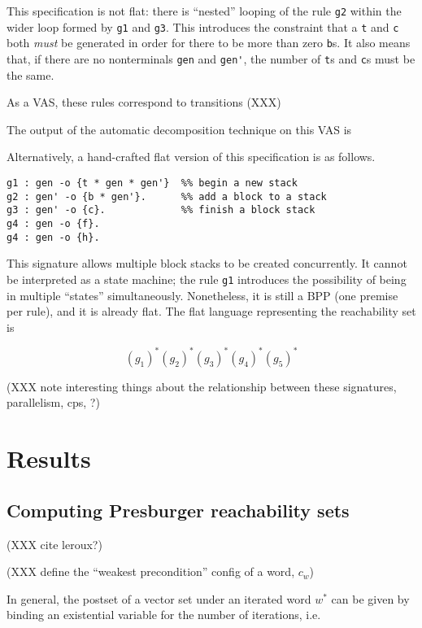 \documentclass[fullpage, 11pt]{article}
\begin{document}
This specification is not flat: there is ``nested'' looping of the rule
\verb|g2| within the wider loop formed by \verb|g1| and \verb|g3|. This
introduces the constraint that a \verb|t| and \verb|c| both {\em must} be
generated in order for there to be more than zero \verb|b|s. It also means
that, if there are no nonterminals \verb|gen| and \verb|gen'|, the number
of \verb|t|s and \verb|c|s must be the same.

As a VAS, these rules correspond to transitions (XXX)

The output of the automatic decomposition technique on this VAS is

Alternatively, a hand-crafted flat version of this specification is as
follows.

\begin{verbatim}
g1 : gen -o {t * gen * gen'}  %% begin a new stack
g2 : gen' -o {b * gen'}.      %% add a block to a stack
g3 : gen' -o {c}.             %% finish a block stack
g4 : gen -o {f}.        
g4 : gen -o {h}.       
\end{verbatim}

This signature allows multiple block stacks to be created concurrently. It
cannot be interpreted as a state machine; the rule \verb|g1| introduces the
possibility of being in multiple ``states'' simultaneously. Nonetheless, it
is still a BPP (one premise per rule), and it is already flat. The flat
language representing the reachability set is

\[
(g_1)^*(g_2)^*(g_3)^*(g_4)^*(g_5)^*
\]

(XXX note interesting things about the relationship between these
 signatures, parallelism, cps, ?)

\section{Results}

\subsection{Computing Presburger reachability sets}

(XXX cite leroux?)

(XXX define the ``weakest precondition'' config of a word, $c_w$)

In general, the postset of a vector set under an iterated word $w^*$ can be
given by binding an existential variable for the number of iterations, i.e.
\end{document}
